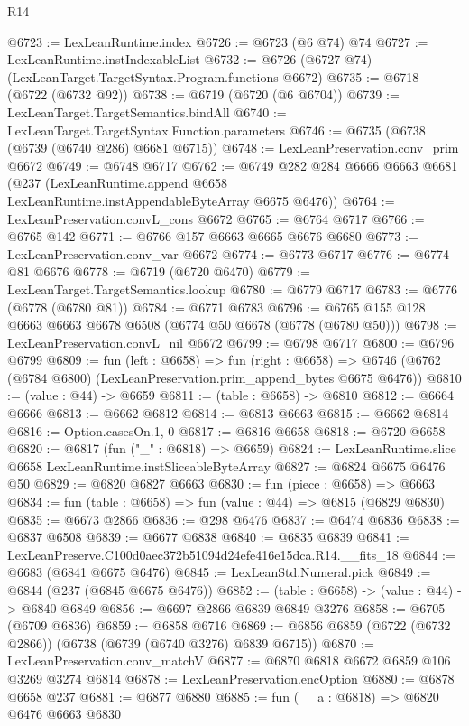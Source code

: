 \begin{lexlean}{R14}
\begin{coremodule}
@6723 := LexLeanRuntime.index
@6726 := @6723 (@6 @74) @74
@6727 := LexLeanRuntime.instIndexableList
@6732 := @6726 (@6727 @74) (LexLeanTarget.TargetSyntax.Program.functions @6672)
@6735 := @6718 (@6722 (@6732 @92))
@6738 := @6719 (@6720 (@6 @6704))
@6739 := LexLeanTarget.TargetSemantics.bindAll
@6740 := LexLeanTarget.TargetSyntax.Function.parameters
@6746 := @6735 (@6738 (@6739 (@6740 @286) @6681 @6715))
@6748 := LexLeanPreservation.conv_prim @6672
@6749 := @6748 @6717
@6762 := @6749
    @282
    @284
    @6666
    @6663
    @6681
    (@237 (LexLeanRuntime.append @6658 LexLeanRuntime.instAppendableByteArray @6675 @6476))
@6764 := LexLeanPreservation.convL_cons @6672
@6765 := @6764 @6717
@6766 := @6765 @142
@6771 := @6766 @157 @6663 @6665 @6676 @6680
@6773 := LexLeanPreservation.conv_var @6672
@6774 := @6773 @6717
@6776 := @6774 @81 @6676
@6778 := @6719 (@6720 @6470)
@6779 := LexLeanTarget.TargetSemantics.lookup
@6780 := @6779 @6717
@6783 := @6776 (@6778 (@6780 @81))
@6784 := @6771 @6783
@6796 := @6765 @155 @128 @6663 @6663 @6678 @6508 (@6774 @50 @6678 (@6778 (@6780 @50)))
@6798 := LexLeanPreservation.convL_nil @6672
@6799 := @6798 @6717
@6800 := @6796 @6799
@6809 := fun (left : @6658) =>
  fun (right : @6658) =>
  @6746 (@6762 (@6784 @6800) (LexLeanPreservation.prim_append_bytes @6675 @6476))
@6810 := (value : @44) -> @6659
@6811 := (table : @6658) -> @6810
@6812 := @6664 @6666
@6813 := @6662 @6812
@6814 := @6813 @6663
@6815 := @6662 @6814
@6816 := Option.casesOn.{1, 0}
@6817 := @6816 @6658
@6818 := @6720 @6658
@6820 := @6817 (fun ("_" : @6818) => @6659)
@6824 := LexLeanRuntime.slice @6658 LexLeanRuntime.instSliceableByteArray
@6827 := @6824 @6675 @6476 @50
@6829 := @6820 @6827 @6663
@6830 := fun (piece : @6658) => @6663
@6834 := fun (table : @6658) => fun (value : @44) => @6815 (@6829 @6830)
@6835 := @6673 @2866
@6836 := @298 @6476
@6837 := @6474 @6836
@6838 := @6837 @6508
@6839 := @6677 @6838
@6840 := @6835 @6839
@6841 := LexLeanPreserve.C100d0aec372b51094d24efe416e15dca.R14.__fits_18
@6844 := @6683 (@6841 @6675 @6476)
@6845 := LexLeanStd.Numeral.pick
@6849 := @6844 (@237 (@6845 @6675 @6476))
@6852 := (table : @6658) -> (value : @44) -> @6840 @6849
@6856 := @6697 @2866 @6839 @6849 @3276
@6858 := @6705 (@6709 @6836)
@6859 := @6858 @6716
@6869 := @6856 @6859 (@6722 (@6732 @2866)) (@6738 (@6739 (@6740 @3276) @6839 @6715))
@6870 := LexLeanPreservation.conv_matchV
@6877 := @6870 @6818 @6672 @6859 @106 @3269 @3274 @6814
@6878 := LexLeanPreservation.encOption
@6880 := @6878 @6658 @237
@6881 := @6877 @6880
@6885 := fun (__a : @6818) => @6820 @6476 @6663 @6830

\end{coremodule}
\end{lexlean}
